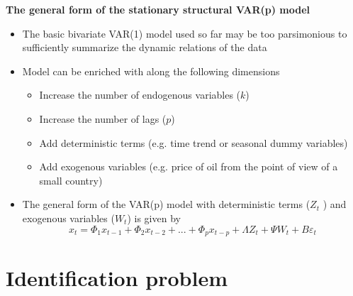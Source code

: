 \begin{frame}
{\textbf{The general form of the stationary structural VAR(p) model}}\medskip

\begin{itemize}
\item The basic bivariate VAR(1) model used so far may be too parsimonious
to sufficiently summarize the dynamic relations of the data\bigskip \pause

\item Model can be enriched with along the following dimensions\smallskip

\begin{itemize}
\item Increase the number of endogenous variables ($k$)\medskip

\item Increase the number of lags ($p$)\medskip

\item Add deterministic terms (e.g. time trend or seasonal dummy
variables)\medskip

\item Add exogenous variables (e.g. price of oil from the point of view of a
small country)\bigskip \medskip \pause
\end{itemize}

\item The general form of the VAR(p) model with deterministic terms ($Z_{t}$%
) and exogenous variables ($W_{t}$) is given by\medskip 
\begin{equation*}
x_{t}=\Phi _{1}x_{t-1}+\Phi _{2}x_{t-2}+...+\Phi _{p}x_{t-p}+\Lambda
Z_{t}+\Psi W_{t}+B\varepsilon _{t}
\end{equation*}
\end{itemize}
\end{frame}


\section{Identification problem}

\begin{frame}
\vspace{3cm}\color{title} 
\end{frame}

\vspace{.1cm}

